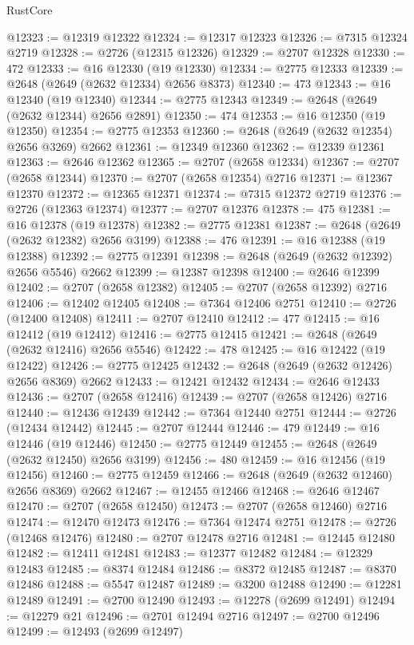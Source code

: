 \begin{lexlean}{RustCore}
\begin{coremodule}
@12323 := @12319 @12322
@12324 := @12317 @12323
@12326 := @7315 @12324 @2719
@12328 := @2726 (@12315 @12326)
@12329 := @2707 @12328
@12330 := 472
@12333 := @16 @12330 (@19 @12330)
@12334 := @2775 @12333
@12339 := @2648 (@2649 (@2632 @12334) @2656 @8373)
@12340 := 473
@12343 := @16 @12340 (@19 @12340)
@12344 := @2775 @12343
@12349 := @2648 (@2649 (@2632 @12344) @2656 @2891)
@12350 := 474
@12353 := @16 @12350 (@19 @12350)
@12354 := @2775 @12353
@12360 := @2648 (@2649 (@2632 @12354) @2656 @3269) @2662
@12361 := @12349 @12360
@12362 := @12339 @12361
@12363 := @2646 @12362
@12365 := @2707 (@2658 @12334)
@12367 := @2707 (@2658 @12344)
@12370 := @2707 (@2658 @12354) @2716
@12371 := @12367 @12370
@12372 := @12365 @12371
@12374 := @7315 @12372 @2719
@12376 := @2726 (@12363 @12374)
@12377 := @2707 @12376
@12378 := 475
@12381 := @16 @12378 (@19 @12378)
@12382 := @2775 @12381
@12387 := @2648 (@2649 (@2632 @12382) @2656 @3199)
@12388 := 476
@12391 := @16 @12388 (@19 @12388)
@12392 := @2775 @12391
@12398 := @2648 (@2649 (@2632 @12392) @2656 @5546) @2662
@12399 := @12387 @12398
@12400 := @2646 @12399
@12402 := @2707 (@2658 @12382)
@12405 := @2707 (@2658 @12392) @2716
@12406 := @12402 @12405
@12408 := @7364 @12406 @2751
@12410 := @2726 (@12400 @12408)
@12411 := @2707 @12410
@12412 := 477
@12415 := @16 @12412 (@19 @12412)
@12416 := @2775 @12415
@12421 := @2648 (@2649 (@2632 @12416) @2656 @5546)
@12422 := 478
@12425 := @16 @12422 (@19 @12422)
@12426 := @2775 @12425
@12432 := @2648 (@2649 (@2632 @12426) @2656 @8369) @2662
@12433 := @12421 @12432
@12434 := @2646 @12433
@12436 := @2707 (@2658 @12416)
@12439 := @2707 (@2658 @12426) @2716
@12440 := @12436 @12439
@12442 := @7364 @12440 @2751
@12444 := @2726 (@12434 @12442)
@12445 := @2707 @12444
@12446 := 479
@12449 := @16 @12446 (@19 @12446)
@12450 := @2775 @12449
@12455 := @2648 (@2649 (@2632 @12450) @2656 @3199)
@12456 := 480
@12459 := @16 @12456 (@19 @12456)
@12460 := @2775 @12459
@12466 := @2648 (@2649 (@2632 @12460) @2656 @8369) @2662
@12467 := @12455 @12466
@12468 := @2646 @12467
@12470 := @2707 (@2658 @12450)
@12473 := @2707 (@2658 @12460) @2716
@12474 := @12470 @12473
@12476 := @7364 @12474 @2751
@12478 := @2726 (@12468 @12476)
@12480 := @2707 @12478 @2716
@12481 := @12445 @12480
@12482 := @12411 @12481
@12483 := @12377 @12482
@12484 := @12329 @12483
@12485 := @8374 @12484
@12486 := @8372 @12485
@12487 := @8370 @12486
@12488 := @5547 @12487
@12489 := @3200 @12488
@12490 := @12281 @12489
@12491 := @2700 @12490
@12493 := @12278 (@2699 @12491)
@12494 := @12279 @21
@12496 := @2701 @12494 @2716
@12497 := @2700 @12496
@12499 := @12493 (@2699 @12497)

\end{coremodule}
\end{lexlean}
